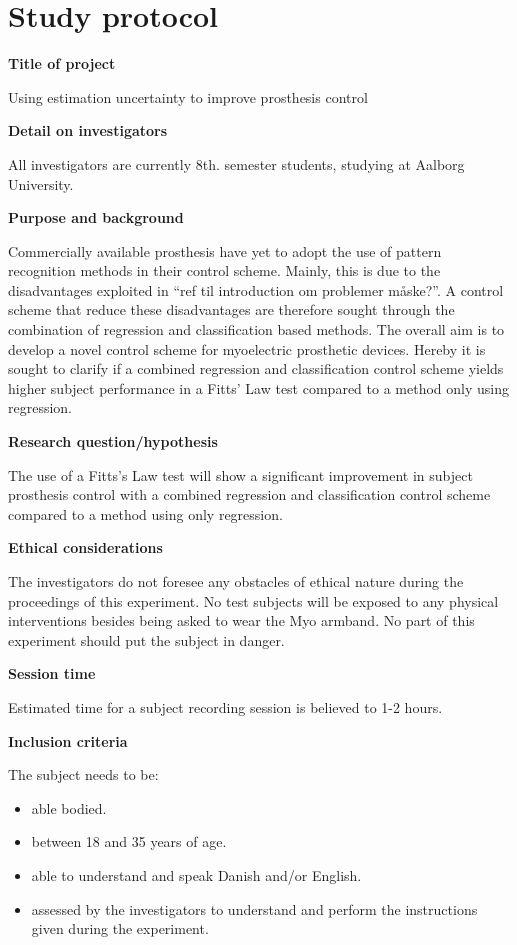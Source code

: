 \section{Study protocol}

\textbf{Title of project}

Using estimation uncertainty to improve prosthesis control 

\textbf{Detail on investigators}

All investigators are currently 8th. semester students, studying at Aalborg University.  

\textbf{Purpose and background}

Commercially available prosthesis have yet to adopt the use of pattern recognition methods in their control scheme. Mainly, this is due to the disadvantages exploited in “ref til introduction om problemer måske?”. A control scheme that reduce these disadvantages are therefore sought through the combination of regression and classification based methods. 
The overall aim is to develop a novel control scheme for myoelectric prosthetic devices. Hereby it is sought to clarify if a combined regression and classification control scheme yields higher subject performance in a Fitts’ Law test compared to a method only using regression.         

\textbf{Research question/hypothesis}

The use of a Fitts’s Law test will show a significant improvement in subject prosthesis control with a combined regression and classification control scheme compared to a method using only regression. 

\textbf{Ethical considerations}  

The investigators do not foresee any obstacles of ethical nature during the proceedings of this experiment. No test subjects will be exposed to any physical interventions besides being asked to wear the Myo armband. No part of this experiment should put the subject in danger. 

\textbf{Session time} 

Estimated time for a subject recording session is believed to 1-2 hours. 

\textbf{Inclusion criteria}

The subject needs to be:
\begin{itemize}
	\item able bodied.
	\item between 18 and 35 years of age.
	\item able to understand and speak Danish and/or English.
	\item assessed by the investigators to understand and perform the instructions given during the experiment. 
\end{itemize}


